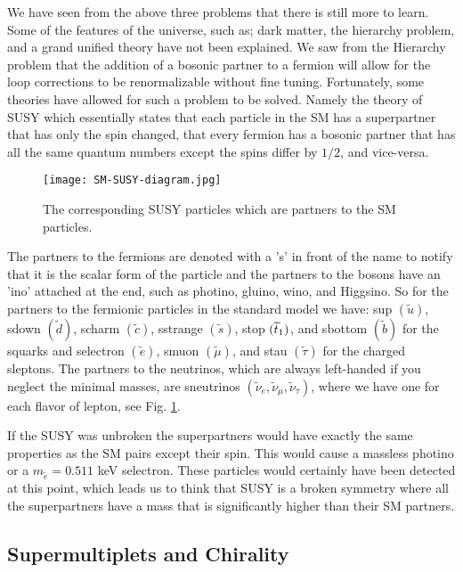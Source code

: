 We have seen from the above three problems that there is still more to learn. Some of the features of the universe, such as; dark matter, the hierarchy problem, and a grand unified theory have not been explained. We saw from the Hierarchy problem that the addition of a bosonic partner to a fermion will allow for the loop corrections to be renormalizable without fine tuning. Fortunately, some theories have allowed for such a problem to be solved. Namely the theory of SUSY which essentially states that each particle in the SM has a superpartner that has only the spin changed, that every fermion has a bosonic partner that has all the same quantum numbers except the spins differ by $1/2$, and vice-versa.

\begin{figure}
 	\centering
	\texttt{[image: SM-SUSY-diagram.jpg]}
 	\caption[Supersymmetry and Standard Model Particles]{The corresponding SUSY particles which are partners to the SM particles.}
 	\label{SUSYParticles} 
\end{figure}

The partners to the fermions are denoted with a 's' in front of the name to notify that it is the scalar form of the particle and the partners to the bosons have an 'ino' attached at the end, such as photino, gluino, wino, and Higgsino. So for the partners to the fermionic particles in the standard model we have: sup $(\widetilde{u})$, sdown $(\widetilde{d})$, scharm $(\widetilde{c})$, sstrange $(\widetilde{s})$, stop $(\widetilde{t}_1)$, and sbottom $(\widetilde{b})$ for the squarks and selectron $(\widetilde{e})$, smuon $(\widetilde{\mu})$, and stau $(\widetilde{\tau})$ for the charged sleptons. The partners to the neutrinos, which are always left-handed if you neglect the minimal masses, are sneutrinos $(\widetilde{\nu}_e, \widetilde{\nu}_\mu, \widetilde{\nu}_\tau)$, where we have one for each flavor of lepton, see Fig. \ref{SUSYParticles}. 

If the SUSY was unbroken the superpartners would have exactly the same properties as the SM pairs except their spin. This would cause a massless photino or a $m_{\widetilde{e}}=0.511$ keV selectron. These particles would certainly have been detected at this point, which leads us to think that SUSY is a broken symmetry where all the superpartners have a mass that is significantly higher than their SM partners. 

\subsection{Supermultiplets and Chirality}
\label{subsec:chiral}

